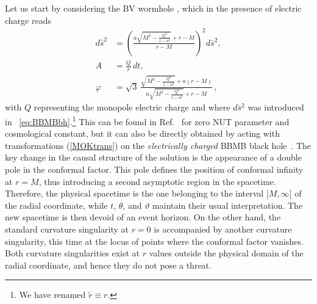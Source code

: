 \documentclass[aps,preprint,groupedaddress,nofootinbib,superscriptaddress,showkeys,showpacs,eqsecnum,amsmath,amssymb]{revtex4-1}
\begin{document}
Let us start by considering the BV wormhole \cite{Barcelo:1999hq,Barcelo:2000zf}, which in the presence of electric charge reads 
\begin{subequations}
\begin{align}
d\hat{s}^2 &= \left( \frac{a\sqrt{M^2-\frac{Q^2}{1-a^2}} + r-M}{r-M} \right)^2 d\bar{s}^2,\\
A &= \frac{Q}{r} \, dt, \\
\varphi &= \sqrt{3} \, \frac{\sqrt{M^2-\frac{Q^2}{1-a^2}} + a(r-M)}{a\sqrt{M^2-\frac{Q^2}{1-a^2}} + r-M} \,,
\end{align}
\end{subequations}
with $Q$ representing the monopole electric charge and where $d\bar{s}^2$ was introduced in ~\eqref{eq:BBMBbh}.\footnote{We have renamed $\tilde{r}\equiv r$.} This can be found in Ref.~\cite{Barrientos:2022avi} for zero NUT parameter and cosmological constant, but it can also be directly obtained by acting with transformations (\ref{MOKtrans}) on the \emph{electrically charged} BBMB black hole~\cite{Bekenstein:1974sf}. The key change in the causal structure of the solution is the appearance of a double pole in the conformal factor. This pole defines the position of conformal infinity at $r=M$, thus introducing a second asymptotic region in the spacetime. Therefore, the physical spacetime is the one belonging to the interval $]M,\infty[$ of the radial coordinate, while $t$, $\theta$, and $\vartheta$ maintain their usual interpretation. The new spacetime is then devoid of an event horizon. On the other hand, the standard curvature singularity at $r=0$ is accompanied by another curvature singularity, this time at the locus of points where the conformal factor vanishes. Both curvature singularities exist at $r$ values outside the physical domain of the radial coordinate, and hence they do not pose a threat.
\end{document}
